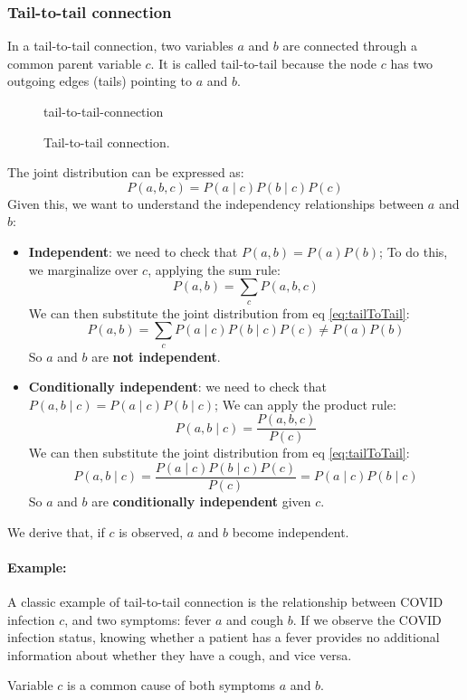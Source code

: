 \subsubsection{Tail-to-tail connection}
In a tail-to-tail connection, two variables $a$ and $b$ are connected through a common parent variable $c$.
It is called tail-to-tail because the node $c$ has two outgoing edges (tails) pointing to $a$ and $b$.
\begin{figure}[H]
\centering
    {tail-to-tail-connection}
    \caption{Tail-to-tail connection.}
\end{figure}
The joint distribution can be expressed as:
\begin{equation}
    \label{eq:tailToTail}
    P(a, b, c) = P(a \mid c) P(b \mid c) P(c)
\end{equation}
Given this, we want to understand the independency relationships between $a$ and $b$:
\begin{itemize}
    \item \textbf{Independent}: we need to check that $P(a, b) = P(a) P(b)$;
    To do this, we marginalize over $c$, applying the sum rule:
    \[ P(a, b) = \sum_{c} P(a, b, c) \]
    We can then substitute the joint distribution from eq \ref{eq:tailToTail}:
    \[ P(a, b) = \sum_{c} P(a \mid c) P(b \mid c) P(c) \neq P(a) P(b)\]
    So $a$ and $b$ are \textbf{not independent}.
    \item \textbf{Conditionally independent}: we need to check that $P(a, b \mid c) = P(a \mid c) P(b \mid c)$;
    We can apply the product rule:
    \[ P(a, b \mid c) = \frac{P(a, b, c)}{P(c)} \]
    We can then substitute the joint distribution from eq \ref{eq:tailToTail}:
    \[ P(a, b \mid c) = \frac{P(a \mid c) P(b \mid c) P(c)}{P(c)} = P(a \mid c) P(b \mid c) \]
    So $a$ and $b$ are \textbf{conditionally independent} given $c$.
\end{itemize}
We derive that, if $c$ is observed, $a$ and $b$ become independent.
\paragraph{Example:}
A classic example of tail-to-tail connection is the relationship between COVID infection $c$, 
and two symptoms: fever $a$ and cough $b$.
If we observe the COVID infection status, knowing whether a patient has a fever provides no 
additional information about whether they have a cough, and vice versa.

Variable $c$ is a common cause of both symptoms $a$ and $b$.

